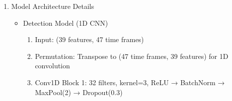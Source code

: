 \documentclass[conference]{IEEEtran}
\begin{document}
\begin{enumerate}
\begin{itemize}
                            \begin{itemize} 
                                \item Optimizer: Adam with learning rate 0.001 
                                \item Loss Function: Binary cross-entropy 
                                \item Batch Size: 32 
                                \item Epochs: 50 (with early stopping, patience=10) 
                                \item Learning Rate Schedule: ReduceLROnPlateau (factor=0.5, patience=5) 
                                \item Metrics: Accuracy, Precision, Recall, AUC 
                            \end{itemize} 
                        \textbf{Classification Model:} 
                            \begin{itemize} 
                                \item Optimizer: Adam with learning rate 0.0001 
                                \item Loss Function: Categorical cross-entropy 
                                \item Batch Size: 32 
                                \item Epochs: 100 (with early stopping, patience=15) 
                                \item Learning Rate Schedule: ReduceLROnPlateau (factor=0.5, patience=7) 
                                \item Metrics: Categorical accuracy, Top-2 accuracy 
                            \end{itemize}
                \end{itemize}
            \item Model Architecture Details
                \begin{itemize}
                    \item Detection Model (1D CNN)
                        \begin{enumerate} 
                            \item Input: (39 features, 47 time frames) 
                            \item Permutation: Transpose to (47 time frames, 39 features) for 1D convolution 
                            \item Conv1D Block 1: 32 filters, kernel=3, ReLU → BatchNorm → MaxPool(2) → Dropout(0.3)

\end{enumerate}
\end{itemize}
\end{enumerate}
\end{document}
